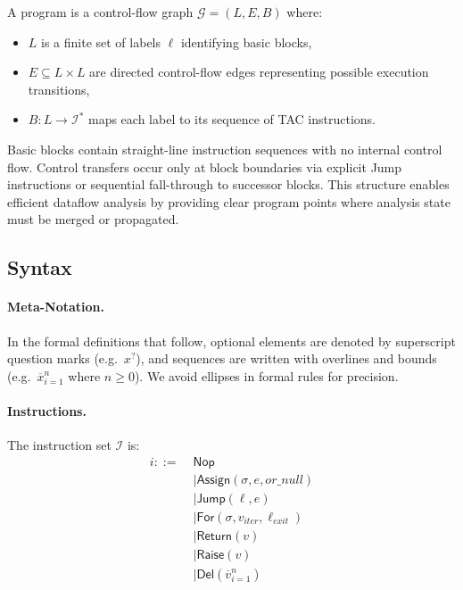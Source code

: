 A program is a control-flow graph $\mathcal{G} = (L,E,B)$ where:
\begin{itemize}
\item $L$ is a finite set of labels $\ell$ identifying basic blocks,
\item $E \subseteq L \times L$ are directed control-flow edges representing possible execution transitions,
\item $B : L \to \mathcal{I}^*$ maps each label to its sequence of TAC instructions.
\end{itemize}

Basic blocks contain straight-line instruction sequences with no internal control flow. Control transfers occur only at block boundaries via explicit \textsf{Jump} instructions or sequential fall-through to successor blocks. This structure enables efficient dataflow analysis by providing clear program points where analysis state must be merged or propagated.

\subsection{Syntax}

\paragraph{Meta-Notation.}
In the formal definitions that follow, optional elements are denoted by superscript question marks (e.g.\ $x^{?}$), and sequences are written with overlines and bounds (e.g.\ $\overline{x}_{i=1}^{n}$ where $n \geq 0$). We avoid ellipses in formal rules for precision.

\paragraph{Instructions.}
The instruction set $\mathcal{I}$ is:
\[
\begin{aligned}
i ::= \;& \mathsf{Nop} \\
  &\mid \mathsf{Assign}(\sigma, e, \mathit{or\_null}) \\
  &\mid \mathsf{Jump}(\ell, e) \\
  &\mid \mathsf{For}(\sigma, v_{\mathit{iter}}, \ell_{\mathit{exit}}) \\
  &\mid \mathsf{Return}(v) \\
  &\mid \mathsf{Raise}(v) \\
  &\mid \mathsf{Del}(\overline{v}_{i=1}^{n})
\end{aligned}
\]

